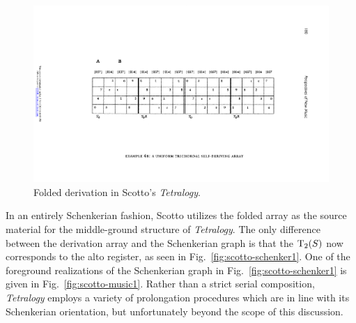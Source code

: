 \begin{example}
	\begin{figure}[htbp]
    	\centering
		\includegraphics[width=6.5in]{figures/scotto-folded.pdf}
		\caption[Folded derivation in Scotto's \emph{Tetralogy}]{Folded derivation in Scotto's \emph{Tetralogy}.}
    	\label{fig:scotto-folded}
	\end{figure}
	
	\noindent In an entirely Schenkerian fashion, Scotto utilizes the folded array as the source material for the middle-ground structure of \emph{Tetralogy}. The only difference between the derivation array and the Schenkerian graph is that the $\operatorname{T}_2(S)$ now corresponds to the alto register, as seen in Fig.~\ref{fig:scotto-schenker1}. One of the foreground realizations of the Schenkerian graph in Fig.~\ref{fig:scotto-schenker1} is given in Fig.~\ref{fig:scotto-music1}. Rather than a strict serial composition, \emph{Tetralogy} employs a variety of prolongation procedures which are in line with its Schenkerian orientation, but unfortunately beyond the scope of this discussion.
	

\end{example}
